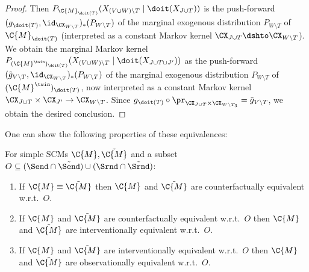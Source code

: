 \begin{proof}
  Then $P_{\C{M}_{\doit(T)}}(X_{(V \cup W)\setminus T} \mid \doit(X_{J\cup T}))$ is 
  the push-forward $(g_{\doit(T)},\id_{\CX_{W\setminus T}})_*(P_{W\setminus T})$ of the marginal exogenous distribution 
  $P_{W\setminus T}$ of $\C{M}_{\doit(T)}$ (interpreted as a constant Markov kernel $\CX_{J \cup T} \dshto \CX_{W \setminus T}$).
  We obtain the marginal Markov kernel $P_{(\C{M}^\twin)_{\doit(T)}}(X_{(V \cup W) \setminus T} \mid \doit(X_{J\cup T\cup J'}))$ as the push-forward 
  $(\tilde{g}_{V\setminus T},\id_{\CX_{W\setminus T}})_*(P_{W\setminus T})$ of the marginal exogenous distribution $P_{W\setminus T}$ of $(\C{M}^\twin)_{\doit(T)}$, now interpreted as a constant
  Markov kernel $\CX_{J\cup T} \times \CX_{J'} \to \CX_{W\setminus T}$. 
  Since $g_{\doit(T)} \circ \pr_{\CX_{J\cup T} \times \CX_{W\setminus T_3}} = \tilde{g}_{V\setminus T}$,
  we obtain the desired conclusion.
\end{proof}
One can show the following properties of these equivalences:
\begin{Prp}
  For simple SCMs $\C{M}, \tilde{\C{M}}$ and a subset $O \subseteq (\Send \cap \tilde{\Send}) \cup (\Srnd \cap \tilde{\Srnd})$:
  \begin{enumerate}
    \item If $\C{M} \equiv \tilde{\C{M}}$ then $\C{M}$ and $\tilde{\C{M}}$ are counterfactually equivalent w.r.t.\ $O$.
    \item If $\C{M}$ and $\tilde{\C{M}}$ are counterfactually equivalent w.r.t.\ $O$ then 
      $\C{M}$ and $\tilde{\C{M}}$ are interventionally equivalent w.r.t.\ $O$.
    \item If $\C{M}$ and $\tilde{\C{M}}$ are interventionally equivalent w.r.t.\ $O$ then 
      $\C{M}$ and $\tilde{\C{M}}$ are observationally equivalent w.r.t.\ $O$.
  \end{enumerate}
\end{Prp}
